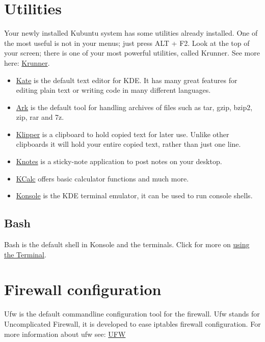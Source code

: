 \documentclass[letterpaper,10pt,english]{sphinxmanual}
\begin{document}
\section{Utilities}
\label{\detokenize{docs/software:utilities}}
Your newly installed Kubuntu system has some utilities already installed. One of the most useful is not in your menus; just press ALT + F2. Look at the top of your screen; there is one of your most powerful utilities, called Krunner. See more here: \href{https://userbase.kde.org/Special:MyLanguage/Plasma/Krunner}{Krunner}.
\begin{itemize}
\item {} 
\href{https://userbase.kde.org/Special:MyLanguage/Kate}{Kate} is the default text editor for KDE. It has many great features for editing plain text or writing code in many different languages.

\item {} 
\href{https://userbase.kde.org/Special:MyLanguage/Ark}{Ark} is the default tool for handling archives of files such as tar, gzip, bzip2, zip, rar and 7z.

\item {} 
\href{https://userbase.kde.org/Special:MyLanguage/Klipper}{Klipper} is a clipboard to hold copied text for later use. Unlike other clipboards it will hold your entire copied text, rather than just one line.

\item {} 
\href{https://userbase.kde.org/Special:MyLanguage/KNotes}{Knotes} is a sticky-note application to post notes on your desktop.

\item {} 
\href{https://userbase.kde.org/Special:MyLanguage/KCalc}{KCalc} offers basic calculator functions and much more.

\item {} 
\href{https://userbase.kde.org/Special:MyLanguage/Konsole}{Konsole} is the KDE terminal emulator, it can be used to run console shells.

\end{itemize}


\subsection{Bash}
\label{\detokenize{docs/software:bash}}
Bash is the default shell in Konsole and the terminals. Click for more on \href{https://help.ubuntu.com/community/UsingTheTerminal}{using the Terminal}.


\section{Firewall configuration}
\label{\detokenize{docs/software:firewall-configuration}}
Ufw is the default commandline configuration tool for the firewall. Ufw stands for Uncomplicated Firewall, it is developed to ease iptables firewall configuration. For more information about ufw see: \href{https://help.ubuntu.com/community/UFW}{UFW}
\end{document}
